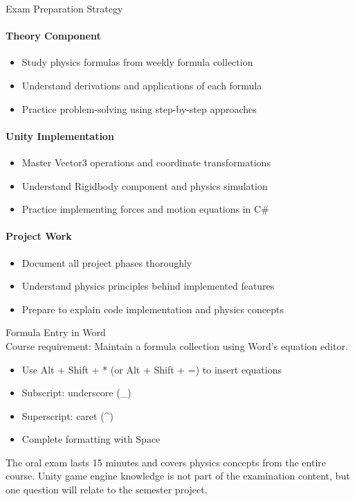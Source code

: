 \begin{KR}{Exam Preparation Strategy}\\
    \paragraph{Theory Component}
    \begin{itemize}
        \item Study physics formulas from weekly formula collection
        \item Understand derivations and applications of each formula
        \item Practice problem-solving using step-by-step approaches
    \end{itemize}
    
    \paragraph{Unity Implementation}
    \begin{itemize}
        \item Master Vector3 operations and coordinate transformations
        \item Understand Rigidbody component and physics simulation
        \item Practice implementing forces and motion equations in C\#
    \end{itemize}
    
    \paragraph{Project Work}
    \begin{itemize}
        \item Document all project phases thoroughly
        \item Understand physics principles behind implemented features
        \item Prepare to explain code implementation and physics concepts
    \end{itemize}
\end{KR}

\begin{example2}{Formula Entry in Word}\\
    Course requirement: Maintain a formula collection using Word's equation editor.
    \tcblower
    \begin{itemize}
        \item Use Alt + Shift + * (or Alt + Shift + =) to insert equations
        \item Subscript: underscore (\_)
        \item Superscript: caret (\^{})
        \item Complete formatting with Space
    \end{itemize}
\end{example2}

\begin{remark}
    The oral exam lasts 15 minutes and covers physics concepts from the entire course. Unity game engine knowledge is not part of the examination content, but one question will relate to the semester project.
\end{remark}
